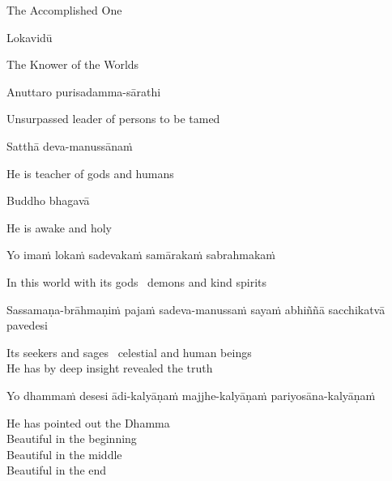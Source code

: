 \begin{english}
  The Accomplished One
\end{english}

Lokavidū

\begin{english}
  The Knower of the Worlds
\end{english}

Anuttaro purisadamma-sārathi

\begin{english}
  Unsurpassed leader of persons to be tamed\hyperlink{endnote3-appendix}{\hypertarget{endnote3-body}{}}
\end{english}

Satthā deva-manussānaṁ

\begin{english}
  He is teacher of gods and humans
\end{english}

Buddho bhagavā

\begin{english}
  He is awake and holy
\end{english}

Yo imaṁ lokaṁ sadevakaṁ samārakaṁ sabrahmakaṁ

\begin{english}
  In this world with its gods \breathmark\ demons and kind spirits
\end{english}

\begin{pali-hang}
  Sassamaṇa-brāhmaṇiṁ pajaṁ sadeva-manussaṁ sayaṁ abhiññā sacchikatvā pavedesi
\end{pali-hang}

\begin{english}
  Its seekers and sages \breathmark\ celestial and human beings\\
  He has by deep insight revealed the truth
\end{english}

\begin{pali-hang}
  Yo dhammaṁ desesi ādi-kalyāṇaṁ majjhe-kalyāṇaṁ pariyosāna-kalyāṇaṁ
\end{pali-hang}

\begin{english-verses}
  He has pointed out the Dhamma\\
  Beautiful in the beginning\\
  Beautiful in the middle\\
  Beautiful in the end\\
\end{english-verses}

